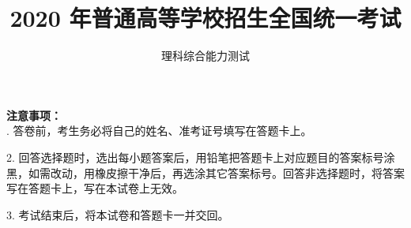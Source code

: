 \documentclass[list,mac]{BHCexam}
\begin{document}
\title{2020 年普通高等学校招生全国统一考试}
\subtitle{理科综合能力测试}
\maketitle
\textbf{注意事项：} \\
. 答卷前，考生务必将自己的姓名、准考证号填写在答题卡上。

2. 回答选择题时，选出每小题答案后，用铅笔把答题卡上对应题目的答案标号涂黑，如需改动，用橡皮擦干净后，再选涂其它答案标号。回答非选择题时，将答案写在答题卡上，写在本试卷上无效。

3. 考试结束后，将本试卷和答题卡一并交回。

\begin{groups}


\begin{questions}[30s]

\end{questions}


\begin{questions}[p]

\end{questions}



\end{groups}
\label{lastpage}
\end{document}
